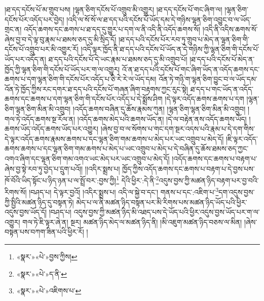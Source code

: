 །ཐ་དད་དངོས་པོ་མ་གྲུབ་པས། །ལྷན་ཅིག་དངོས་པོ་འགྲུབ་མི་འགྱུར། །ཐ་དད་དངོས་པོ་གང་ཞིག་ལ། །ལྷན་ཅིག་དངོས་པོར་འདོད་པར་བྱེད། །འདི་ལ་སོ་སོ་ལ་ཐ་དད་པའི་དངོས་པོ་ཡོད་དམ་དེ་གཉིས་ལྷན་ཅིག་འབྱུང་བ་ལ་ཡོད་གྲང་ན། འདོད་ཆགས་དང་ཆགས་པ་ཐ་དད་དུ་གྱུར་པ་དག་ལ་ནི་འདི་ནི་འདོད་ཆགས་སོ། །འདི་ནི་འདིས་ཆགས་སོ་ཞེས་བྱ་བ་དེ་ལྟ་བུ་རྣམ་པ་ཐམས་ཅད་དུ་མི་སྲིད་དོ། །ཐ་དད་པའི་དངོས་པོར་རབ་ཏུ་གྲུབ་པ་མེད་ན་ལྷན་ཅིག་གི་དངོས་པོ་འགྲུབ་པར་མི་འགྱུར་རོ། །འདི་ལྟར་ཁྱོད་ནི་ཐ་དད་པའི་དངོས་པོ་ཡོད་ན་དེ་གཉིས་ཀྱི་ལྷན་ཅིག་གི་དངོས་པོ་ཡོད་པར་འདོད་ན། ཐ་དད་པའི་དངོས་པོ་དེ་ཡང་རྣམ་པ་ཐམས་ཅད་དུ་མི་འགྲུབ་པོ། །ཐ་དད་པའི་དངོས་པོ་མེད་ན་ཁྱོད་ཀྱི་ལྷན་ཅིག་གི་དངོས་པོ་ཡོད་པར་ག་ལ་འགྱུར། འོ་ན་ཐ་དད་པའི་དངོས་པོ་གང་ཞིག་ཡོད་ན་འདོད་ཆགས་དང་ཆགས་པ་དག་ལྷན་ཅིག་གི་དངོས་པོར་འདོད་པ་ཅི་རེ་རེ་ལ་ཡོད་དམ། འོན་ཏེ་གཉི་ག་ལྷན་ཅིག་བྱུང་བ་ལ་ཡོད་དམ་འོན་ཏེ་ཁྱོད་ཀྱིས་རང་དགར་ཐ་དད་པའི་དངོས་པོ་གཞན་ཞིག་བརྟགས་ཀྱང་རུང་སྟེ། ཐ་དད་པ་གང་ཡོད་ན་འདོད་ཆགས་དང་ཆགས་པ་དག་ལྷན་ཅིག་གི་དངོས་པོར་འདོད་པ་དེ་སྨྲོས་ཤིག །དེ་ལྟར་འདོད་ཆགས་ཆགས་པ་དག །ལྷན་ཅིག་ལྷན་ཅིག་མིན་མི་འགྲུབ། །འདོད་ཆགས་བཞིན་དུ་ཆོས་རྣམས་ཀུན། །ལྷན་ཅིག་ལྷན་ཅིག་མིན་མི་འགྲུབ། །གལ་ཏེ་འདོད་ཆགས་སྔ་རོལ་ན། །འདོད་ཆགས་མེད་པའི་ཆགས་ཡོད་ན། །དེ་ལ་བརྟེན་ནས་འདོད་ཆགས་ཡོད། །ཆགས་ཡོད་འདོད་ཆགས་ཡོད་པར་འགྱུར། །ཞེས་བྱ་བ་ལ་སོགས་པ་གང་དག་སྔར་འདས་པའི་རྣམ་པ་དེ་དག་གིས་དེ་ལྟར་འདོད་ཆགས་རྣམས་ཆགས་པ་དང་ལྷན་ཅིག་གམ་ཆགས་པ་མེད་པར་ཡང་འགྲུབ་པ་མེད་དོ། །ཇི་ལྟར་འདོད་ཆགས་ཆགས་པ་དང་ལྷན་ཅིག་གམ་ཆགས་པ་མེད་པ་ཡང་འགྲུབ་པ་མེད་པ་དེ་བཞིན་དུ་ཆོས་ཐམས་ཅད་ཀྱང་འགའ་ཞིག་དང་ལྷན་ཅིག་གམ་འགའ་ཡང་མེད་པར་ཡང་འགྲུབ་པ་མེད་དོ། །འདོད་ཆགས་དང་ཆགས་པ་བརྟག་པ་ཞེས་བྱ་སྟེ་རབ་ཏུ་བྱེད་པ་དྲུག་པའོ།། །།འདིར་སྨྲས་པ། ཁྱོད་ཀྱིས་འདོད་ཆགས་དང་ཆགས་པ་བརྟག་པ་དེ་བྱས་པས་ཁོ་བོའི་ཡིད་སྟོང་པ་ཉིད་ཉན་པ་ལ་སྤྲོ་བར་:བྱས་ཀྱི།\footnote{«སྣར་»«པེ་»བྱས་ཀྱིས།} དེའི་ཕྱིར་:དེ་ནི་\footnote{«སྣར་»«པེ་»ད་ནི་}འདུས་བྱས་ཀྱི་མཚན་ཉིད་བརྟག་པར་བྱ་བའི་རིགས་སོ། །བཤད་པ། དེ་ལྟར་བྱའོ། །འདིར་སྨྲས་པ། འདི་ལ་སྐྱེ་བ་དང་། གནས་པ་དང་:འཇིག་པ་\footnote{«སྣར་»«པེ་»འཇིགས་པ་}དག་འདུས་བྱས་ཀྱི་སྤྱིའི་མཚན་ཉིད་དུ་བསྟན་ཏེ། མེད་པ་ལ་ནི་མཚན་ཉིད་བསྟན་པར་མི་རིགས་པས་མཚན་ཉིད་ཡོད་པའི་ཕྱིར་འདུས་བྱས་ཡོད་དོ། །བཤད་པ། འདུས་བྱས་ཀྱི་མཚན་ཉིད་མི་འཐད་པས་དེ་ཡོད་པའི་ཕྱིར་འདུས་བྱས་ཡོད་པར་ག་ལ་འགྱུར། གལ་ཏེ་ཇི་ལྟར་ཞེ་ན། སྔར། མཚན་ཉིད་མེད་ལ་མཚན་ཉིད་ནི། །མི་འཇུག་མཚན་ཉིད་བཅས་ལ་མིན། །ཞེས་བསྟན་པས་བཀག་ཟིན་པའི་ཕྱིར་རོ། །
